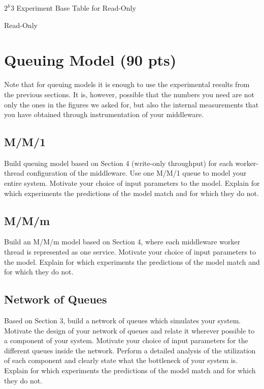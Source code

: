 \documentclass[11pt,a4paper]{article}
\begin{document}
\begin{table}
	\centering
	\small{
		\caption{$2^k3$ Experiment Base Table for Read-Only}
		\label{exp60_ro_2k_base} 
		\setlength{\tabcolsep}{4.5pt}
		
	}
\end{table}


\begin{table}
	\small{
		\centering
		\caption{Read-Only}
		\label{exp60_ro_2k_effect}
		\setlength{\tabcolsep}{4.7pt}
		\newcommand{\rlft}[0]{\raggedleft\arraybackslash}
		
	}
\end{table}

\section{Queuing Model (90 pts)}

Note that for queuing models it is enough to use the experimental results from the previous sections. It is, however, possible that the numbers you need are not only the ones in the figures we asked for, but also the internal measurements that you have obtained through instrumentation of your middleware.

\subsection{M/M/1}

Build queuing model based on Section 4 (write-only throughput) for each worker-thread configuration of the middleware. Use one M/M/1 queue to model your entire system. Motivate your choice of input parameters to the model. Explain for which experiments the predictions of the model match and for which they do not.

\subsection{M/M/m}

Build an M/M/m model based on Section 4, where each middleware worker thread is represented as one service.  Motivate your choice of input parameters to the model. Explain for which experiments the predictions of the model match and for which they do not.

\subsection{Network of Queues}

Based on Section 3, build a network of queues which simulates your system. Motivate the design of your network of queues and relate it wherever possible to a component of your system. Motivate your choice of input parameters for the different queues inside the network. Perform a detailed analysis of the utilization of each component and clearly state what the bottleneck of your system is. Explain for which experiments the predictions of the model match and for which they do not.


{}

\end{document}
